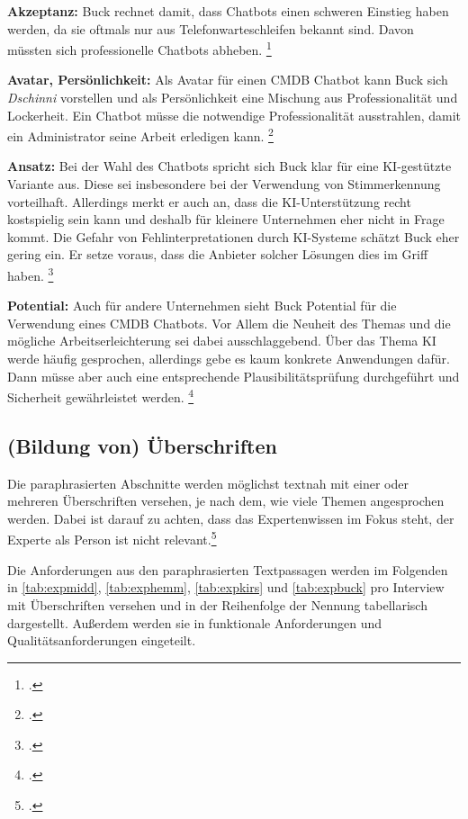 \textbf{Akzeptanz: }Buck rechnet damit, dass Chatbots einen schweren Einstieg haben werden, da sie oftmals nur aus Telefonwarteschleifen bekannt sind. Davon müssten sich professionelle Chatbots abheben. 
\footcite[Vgl.][o. \pno]{Buck_2019}

\textbf{Avatar, Persönlichkeit: }Als Avatar für einen \acs{CMDB} Chatbot kann Buck sich \textit{Dschinni} vorstellen und als Persönlichkeit eine Mischung aus Professionalität und Lockerheit. Ein Chatbot müsse die notwendige Professionalität ausstrahlen, damit ein Administrator seine Arbeit erledigen kann.
\footcite[Vgl.][o. \pno]{Buck_2019}

\textbf{Ansatz: }Bei der Wahl des Chatbots spricht sich Buck klar für eine KI-gestützte Variante aus. Diese sei insbesondere bei der Verwendung von Stimmerkennung vorteilhaft. Allerdings merkt er auch an, dass die KI-Unterstützung recht kostspielig sein kann und deshalb für kleinere Unternehmen eher nicht in Frage kommt. Die Gefahr von Fehlinterpretationen durch KI-Systeme schätzt Buck eher gering ein. Er setze voraus, dass die Anbieter solcher Lösungen dies im Griff haben.
\footcite[Vgl.][o. \pno]{Buck_2019}

\textbf{Potential: }Auch für andere Unternehmen sieht Buck Potential für die Verwendung eines \acs{CMDB} Chatbots. Vor Allem die Neuheit des Themas und die mögliche Arbeitserleichterung sei dabei ausschlaggebend. Über das Thema KI werde häufig gesprochen, allerdings gebe es kaum konkrete Anwendungen dafür. Dann müsse aber auch eine entsprechende Plausibilitätsprüfung durchgeführt und Sicherheit gewährleistet werden.
\footcite[Vgl.][o. \pno]{Buck_2019}



\subsection{(Bildung von) Überschriften} \label{ueber}
Die paraphrasierten Abschnitte werden möglichst textnah mit einer oder mehreren Überschriften versehen, je nach dem, wie viele Themen angesprochen werden. Dabei ist darauf zu achten, dass das Expertenwissen im Fokus steht, der Experte als Person ist nicht relevant.\footcite[Vgl.][458\psq]{Meuser_1991_Interview}

Die Anforderungen aus den paraphrasierten Textpassagen werden im Folgenden in \autoref{tab:expmidd}, \autoref{tab:exphemm}, \autoref{tab:expkirs} und \autoref{tab:expbuck} pro Interview mit Überschriften versehen und in der Reihenfolge der Nennung tabellarisch dargestellt. Außerdem werden sie in funktionale Anforderungen und Qualitätsanforderungen eingeteilt.

